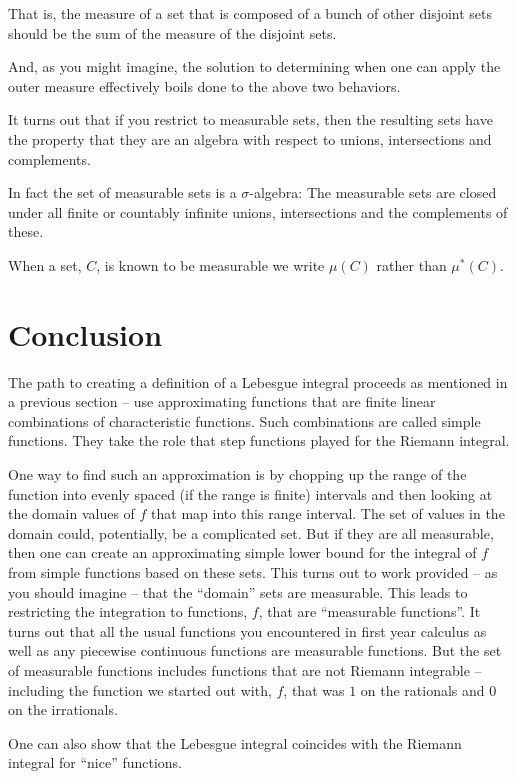 \documentclass{article}
\begin{document}
That is, the measure of a set that is composed of a bunch of other disjoint 
sets should be the sum of the measure of the disjoint sets.

And, as you might imagine, the solution to determining when one can apply the 
outer measure effectively boils done to the above two behaviors.

It turns out that if you restrict to measurable sets, 
then the resulting sets have the property that they are an 
algebra with respect to unions, intersections and complements. 

In fact the set of measurable sets is a $\sigma$-algebra:
The measurable sets are closed under all finite or countably infinite unions, intersections and the complements of these.

When a set, $C$, is known to be measurable we write $\mu(C)$ rather than $\mu^*(C)$.

\section{Conclusion}

The path to creating a definition of a Lebesgue integral proceeds as mentioned 
in a previous section -- use approximating functions that are finite linear
combinations of characteristic functions. Such combinations are called simple 
functions. They take the role that step functions played for the Riemann integral. 

One way to find such an approximation is by chopping up the range of the function 
into evenly spaced (if the range is finite) intervals and then looking at the 
domain values of $f$ that map into this range interval. The set of values in 
the domain could, potentially, be a complicated set. But if they are all measurable, then 
one can create an approximating simple lower bound for the integral of $f$ 
from simple functions based on these sets. This turns out to work provided -- 
as you should imagine -- that the ``domain'' sets are measurable. This leads to 
restricting the integration to functions, $f$, that are ``measurable functions''. 
It turns out that all the usual functions you encountered in first year 
calculus as well as any piecewise continuous functions are measurable functions. 
But the set of measurable functions includes functions that are
not Riemann integrable -- including the function we started out with, $f$, that
was $1$ on the rationals and $0$ on the irrationals.

One can also show that the Lebesgue integral coincides with the Riemann integral 
for ``nice'' functions.
\end{document}
